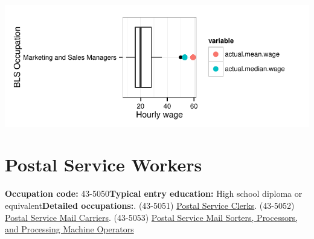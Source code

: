 \documentclass[a4paper,10pt]{article}\usepackage[]{graphicx}\usepackage[]{color}
\makeatletter
\def\maxwidth{ %
  \ifdim\Gin@nat@width>\linewidth
    \linewidth
  \else
    \Gin@nat@width
  \fi
}
\makeatother
\begin{document}
{\centering \includegraphics[width=\maxwidth]{figure/unnamed-chunk-263} 

}


\newpage\section{Postal Service Workers}\textbf{Occupation code:} 43-5050\newline\textbf{Typical entry education:} High school diploma or equivalent\newline\textbf{Detailed occupations:}. (43-5051)  \href{http://www.bls.gov/oes/current/oes435051.htm}{Postal Service Clerks}. (43-5052)  \href{http://www.bls.gov/oes/current/oes435052.htm}{Postal Service Mail Carriers}. (43-5053)  \href{http://www.bls.gov/oes/current/oes435053.htm}{Postal Service Mail Sorters, Processors, and Processing Machine Operators}\newline%
\end{document}
